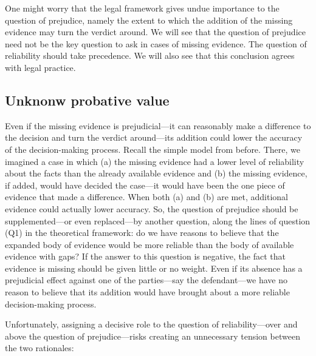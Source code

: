 \documentclass[
  10pt,
  dvipsnames,enabledeprecatedfontcommands]{scrartcl}
\begin{document}
One might worry that the legal framework gives undue importance to the
question of prejudice, namely the extent to which the addition of the
missing evidence may turn the verdict around. We will see that the
question of prejudice need not be the key question to ask in cases of
missing evidence. The question of reliability should take precedence. We
will also see that this conclusion agrees with legal practice.

\hypertarget{unknonw-probative-value}{%
\subsection{Unknonw probative value}\label{unknonw-probative-value}}

Even if the missing evidence is prejudicial---it can reasonably make a
difference to the decision and turn the verdict around---its addition
could lower the accuracy of the decision-making process. Recall the
simple model from before. There, we imagined a case in which (a) the
missing evidence had a lower level of reliability about the facts than
the already available evidence and (b) the missing evidence, if added,
would have decided the case---it would have been the one piece of
evidence that made a difference. When both (a) and (b) are met,
additional evidence could actually lower accuracy. So, the question of
prejudice should be supplemented---or even replaced---by another
question, along the lines of question (Q1) in the theoretical framework:
do we have reasons to believe that the expanded body of evidence would
be more reliable than the body of available evidence with gaps? If the
answer to this question is negative, the fact that evidence is missing
should be given little or no weight. Even if its absence has a
prejudicial effect against one of the parties---say the defendant---we
have no reason to believe that its addition would have brought about a
more reliable decision-making process.

Unfortunately, assigning a decisive role to the question of
reliability---over and above the question of prejudice---risks creating
an unnecessary tension between the two rationales:
\end{document}
